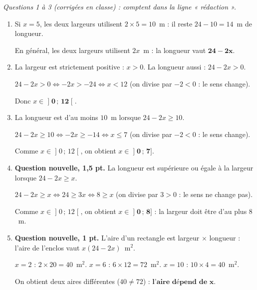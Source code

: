 \documentclass[11pt,a4paper]{article}
\newcommand{\res}[1]{\ensuremath{\mathbf{#1}}}
\begin{document}
\smallskip
\textit{Questions 1 à 3 (corrigées en classe) : comptent dans la ligne « rédaction ».}
\begin{enumerate}
	\item Si $x=5$, les deux largeurs utilisent $2\times 5=10$~m : il reste $24-10=14$~m de longueur.

	En général, les deux largeurs utilisent $2x$~m : la longueur vaut \res{24-2x}.
	\item La largeur est strictement positive : $x>0$. La longueur aussi : $24-2x>0$.

	$24-2x>0 \iff -2x>-24 \iff x<12$ \quad (on divise par $-2<0$ : le sens change).

	Donc $x\in\res{\mathopen{]}0\,;\,12\mathclose{[}}$.
	\item La longueur est d'au moins $10$~m lorsque $24-2x\geqslant 10$.

	$24-2x\geqslant 10 \iff -2x\geqslant -14 \iff x\leqslant 7$ \quad (on divise par $-2<0$ : le sens change).

	Comme $x\in\mathopen{]}0\,;\,12\mathclose{[}$, on obtient $x\in\res{\mathopen{]}0\,;\,7]}$.
	\item {\color{titrebleu}\bfseries Question nouvelle, 1,5 pt.} La longueur est supérieure ou égale à la largeur lorsque $24-2x\geqslant x$.

	$24-2x\geqslant x \iff 24\geqslant 3x \iff 8\geqslant x$ \quad (on divise par $3>0$ : le sens ne change pas).

	Comme $x\in\mathopen{]}0\,;\,12\mathclose{[}$, on obtient $x\in\res{\mathopen{]}0\,;\,8]}$ : la largeur doit être d'au plus $8$~m.
	\item {\color{titrebleu}\bfseries Question nouvelle, 1 pt.} L'aire d'un rectangle est largeur $\times$ longueur : l'aire de l'enclos vaut $x(24-2x)$~m$^2$.

	$x=2$ : $2\times 20=40$~m$^2$. \quad $x=6$ : $6\times 12=72$~m$^2$. \quad $x=10$ : $10\times 4=40$~m$^2$.

	On obtient deux aires différentes ($40\neq 72$) : \res{\text{l'aire dépend de } x}.
\end{enumerate}
\end{document}
